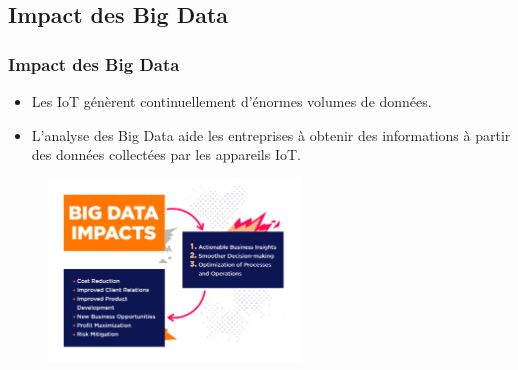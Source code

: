 \documentclass{beamer}
\begin{document}
\subsection{Impact des Big Data}

\begin{frame}
	\frametitle{Impact des Big Data}
	
	\begin{itemize}
		\item Les IoT génèrent continuellement d'énormes volumes de données.
\item L'analyse des Big Data aide les entreprises à obtenir des informations à partir des données collectées par les appareils IoT.
	\end{itemize}
	
	\begin{figure}
		\centering
		\includegraphics[width=0.6\textwidth]{big_data_benefits.jpg}
	\end{figure}
	
\end{frame}
\end{document}
